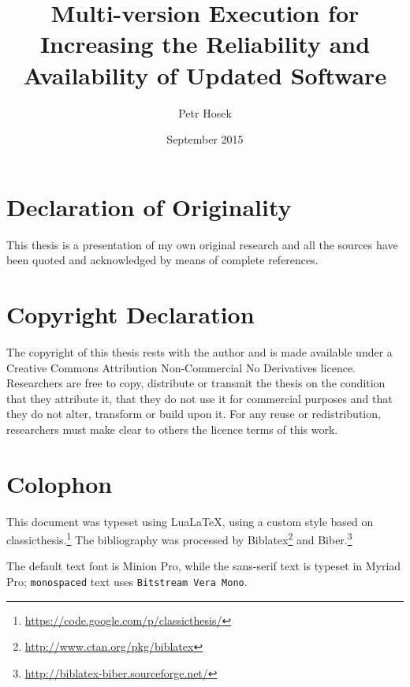 \documentclass[a4paper,12pt,oneside,minionpro,dottedtoc]{thesis}
\title{Multi-version Execution for Increasing the Reliability and Availability of Updated Software}
\author{Petr Hosek}
\date{September 2015}
\begin{document}
\let\question\savedquestion

\maketitle

\cleardoublepage
\thispagestyle{plain}

\section*{Declaration of Originality}
This thesis is a presentation of my own original research and all the sources
have been quoted and acknowledged by means of complete references.

\section*{Copyright Declaration}
The copyright of this thesis rests with the author and is made available under a Creative Commons
Attribution Non-Commercial No Derivatives licence. Researchers are free to copy, distribute or
transmit the thesis on the condition that they attribute it, that they do not use it for commercial
purposes and that they do not alter, transform or build upon it. For any reuse or redistribution,
researchers must make clear to others the licence terms of this work.

\vfill
\section*{Colophon}

This document was typeset using Lua\LaTeX, using a custom style based on
\textsf{classicthesis}.\footnote{\url{https://code.google.com/p/classicthesis/}}
The bibliography was processed by
Biblatex\footnote{\url{http://www.ctan.org/pkg/biblatex}} and
Biber.\footnote{\url{http://biblatex-biber.sourceforge.net/}}

The default text font is Minion Pro, while the \textsf{sans-serif} text is
typeset in \textsf{Myriad Pro}; \texttt{monospaced} text uses \texttt{Bitstream
Vera Mono}.
\end{document}
